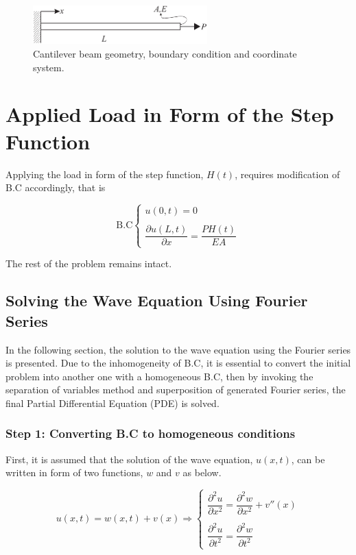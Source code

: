 \documentclass{article}
\begin{document}
\begin{figure}[H]
    \centering
    \includegraphics[width = 0.6\textwidth ]{figures/beam.pdf}
    \caption{Cantilever beam geometry, boundary condition and coordinate system.}
    \label{fig:beam}
\end{figure}

\section{Applied Load in Form of the Step Function}
Applying the load in form of the step function, $H(t)$, requires modification of B.C accordingly, that is 

\begin{equation*}
    \text{B.C}\begin{cases}
        u(0, t) = 0 \\
        \\
        \dfrac{\partial u(L, t)}{\partial x} = \dfrac{P H(t)}{EA}
    \end{cases}
\end{equation*}

The rest of the problem remains intact.

\subsection{Solving the Wave Equation Using Fourier Series}
In the following section, the solution to the wave equation using the Fourier series is presented. Due to the inhomogeneity of B.C, it is essential to convert the initial problem into another one with a homogeneous B.C, then by invoking the separation of variables method and superposition of generated Fourier series, the final Partial Differential Equation (PDE) is solved.

\subsubsection{Step 1: Converting B.C to homogeneous conditions}
First, it is assumed that the solution of the wave equation, $u(x, t)$, can be written in form of two functions, $w$ and $v$ as below.

\begin{equation}
    u(x, t) = w(x, t) + v(x) \Rightarrow \begin{cases}
        \dfrac{\partial^2 u}{\partial x^2} = \dfrac{\partial^2 w}{\partial x^2} + v''(x) \\
        \\
        \dfrac{\partial^2 u}{\partial t^2} = \dfrac{\partial^2 w}{\partial t^2}
    \end{cases}
\label{eq:nh2h}
\end{equation}
\end{document}
